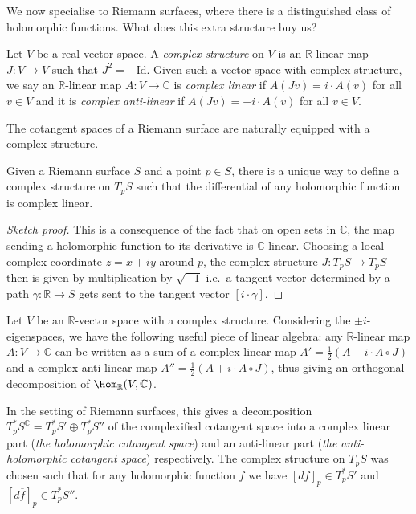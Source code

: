 We now specialise to Riemann surfaces, where there is a distinguished class of
holomorphic functions. What does this extra structure buy us?

\begin{definition}
    Let \(V\) be a real vector space. A \textit{complex structure} on \(V\) is
    an \(\mathbb{R}\)-linear map \(J:V\to V\) such that \(J^2=-\text{Id}\).
    Given such a vector space with complex structure, we say an
    \(\mathbb{R}\)-linear map \(A:V\to \mathbb{C}\) is \textit{complex linear}
    if \(A(Jv)=i\cdot A(v)\) for all \(v\in V\) and it is \textit{complex
    anti-linear} if
    \(A(Jv)=-i\cdot A(v)\) for all \(v\in V\).
\end{definition}

The cotangent spaces of a Riemann surface are naturally equipped with a complex
structure.

\begin{lemma}
    Given a Riemann surface \(S\) and a point \(p\in S\), there is a unique way
    to define a complex structure on \(T_pS\) such that the
    differential of any holomorphic function is complex linear.
    \begin{proof}[Sketch proof]
        This is a consequence of the fact that on open sets in \(\mathbb{C}\),
        the map sending a holomorphic function to its derivative is
        \(\mathbb{C}\)-linear. Choosing a local complex coordinate \(z=x+iy\)
        around \(p\), the complex structure \(J:T_pS\to T_pS\) then is given by
        multiplication by \(\sqrt{-1}\) i.e.\ a tangent vector determined by a
        path \(\gamma:\mathbb{R}\to S\) gets sent to the tangent vector
        \([i\cdot \gamma]\).
    \end{proof}
\end{lemma}

Let \(V\) be an \(\mathbb{R}\)-vector space with a complex structure.
Considering the \(\pm i\)-eigenspaces, we have the following useful piece of
linear algebra: any \(\mathbb{R}\)-linear map \(A:V\to \mathbb{C}\) can be
written as a sum of a complex linear map \(A'=\frac{1}{2}(A-i\cdot A\circ J)\)
and a complex anti-linear map \(A''=\frac{1}{2}(A+i\cdot A\circ J)\), thus
giving an orthogonal decomposition of \(\Hom_\mathbb{R}(V,\mathbb{C})\).

In the setting of Riemann surfaces, this gives a decomposition \(T_p^\ast
S^\mathbb{C}=T_p^\ast S'\oplus T_p^\ast S''\) of the complexified cotangent
space into a complex linear part (\textit{the holomorphic cotangent space}) and
an anti-linear part (\textit{the anti-holomorphic cotangent space})
respectively. The complex structure on \(T_pS\) was chosen such that for any
holomorphic function \(f\) we have \([df]_p\in T_p^\ast S'\) and
\([d\overline{f}]_p\in T_p^\ast S''\).


